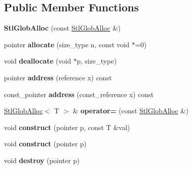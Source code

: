 \subsection*{Public Member Functions}
\begin{DoxyCompactItemize}
\item 
\hypertarget{classStlGlobAlloc_a5761db15bab8fab9d543a03991d16f3e}{{\bfseries Stl\-Glob\-Alloc} (const \hyperlink{classStlGlobAlloc}{Stl\-Glob\-Alloc} \&)}\label{classStlGlobAlloc_a5761db15bab8fab9d543a03991d16f3e}

\item 
\hypertarget{classStlGlobAlloc_af4083b056fdc8da831d153dbdc5b1669}{pointer {\bfseries allocate} (size\-\_\-type n, const void $\ast$=0)}\label{classStlGlobAlloc_af4083b056fdc8da831d153dbdc5b1669}

\item 
\hypertarget{classStlGlobAlloc_a87a14a9eef8ab88fef5845128db0dddd}{void {\bfseries deallocate} (void $\ast$p, size\-\_\-type)}\label{classStlGlobAlloc_a87a14a9eef8ab88fef5845128db0dddd}

\item 
\hypertarget{classStlGlobAlloc_a24fe6c264986f675065c6f920844991b}{pointer {\bfseries address} (reference x) const }\label{classStlGlobAlloc_a24fe6c264986f675065c6f920844991b}

\item 
\hypertarget{classStlGlobAlloc_ac45b7063a2a32d0777b521efef32a1fd}{const\-\_\-pointer {\bfseries address} (const\-\_\-reference x) const }\label{classStlGlobAlloc_ac45b7063a2a32d0777b521efef32a1fd}

\item 
\hypertarget{classStlGlobAlloc_ad6f8c6985353b94be492daccbb18b695}{\hyperlink{classStlGlobAlloc}{Stl\-Glob\-Alloc}$<$ T $>$ \& {\bfseries operator=} (const \hyperlink{classStlGlobAlloc}{Stl\-Glob\-Alloc} \&)}\label{classStlGlobAlloc_ad6f8c6985353b94be492daccbb18b695}

\item 
\hypertarget{classStlGlobAlloc_a21f08aa2dbf8a8957f1a63869eb99418}{void {\bfseries construct} (pointer p, const T \&val)}\label{classStlGlobAlloc_a21f08aa2dbf8a8957f1a63869eb99418}

\item 
\hypertarget{classStlGlobAlloc_a1f630fc4a1d9e126975f2776afb15be3}{void {\bfseries construct} (pointer p)}\label{classStlGlobAlloc_a1f630fc4a1d9e126975f2776afb15be3}

\item 
\hypertarget{classStlGlobAlloc_ab88f9fef4d47e0ea1bd1492deb209dcd}{void {\bfseries destroy} (pointer p)}\label{classStlGlobAlloc_ab88f9fef4d47e0ea1bd1492deb209dcd}


\end{DoxyCompactItemize}
